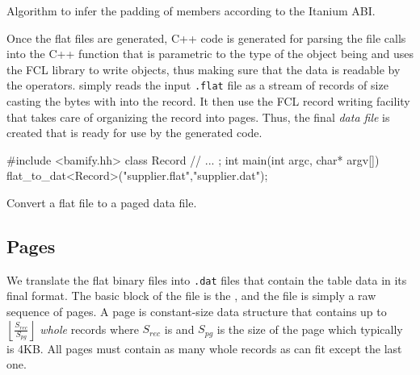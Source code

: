 \begin{code}
  \caption{\label{lst:record_byte_padding}Algorithm to infer the
    padding of members according to the Itanium ABI.}
\end{code}

Once the flat files are generated, C++ code is generated for parsing
the file calls into the C++ function  that is
parametric to the type of the object being and uses the FCL
library to write objects, thus making sure that the data is readable
by the operators.  simply reads the input
\texttt{.flat} file as a stream of records of size
 casting the bytes with
 into the record. It then use the FCL
record writing facility  that takes care of
organizing the record into pages. Thus, the final \emph{data file} is
created that is ready for use by the generated code.

\begin{code}
\begin{cppcode}
#include <bamify.hh>
class Record {
  // ...
};
int main(int argc, char* argv[]) {
  flat_to_dat<Record>("supplier.flat","supplier.dat");
}
\end{cppcode}
  \caption{Convert a flat file to a paged data file.}
\end{code}

\subsection{Pages}

We translate the flat binary files into \texttt{.dat} files that
contain the table data in its final format. The basic block of the
file is the , and the file is simply a raw sequence of
pages. A page is constant-size data structure that contains up to
\(\left\lfloor\frac{S_{rec}}{S_{pg}} \right\rfloor\) \emph{whole}
records where \(S_{rec}\) is  and \(S_{pg}\) is
the size of the page which typically is 4KB. All pages must contain as
many whole records as can fit except the last one.

